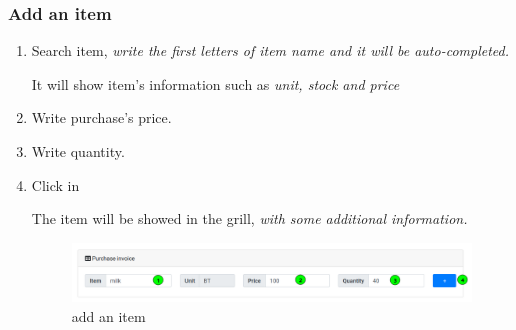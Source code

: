 \documentclass[a4paper,11pt]{refart}
\begin{document}
\subsubsection{Add an item}
\begin{enumerate}
	\item Search item, \emph{write the first letters of item name and it will be auto-completed.}
	
	\medskip
	\begin{leftbar}
		It will show item's information such as \emph{ unit, stock and price}
	\end{leftbar}
	\item Write purchase's price.
	\item Write quantity.
	\item Click in \keys{\texttt{+}}

	\medskip
	\begin{leftbar}
		The item will be showed in the grill,  \emph{with some additional information.}
	\end{leftbar}
	\begin{figure}[H]\centering
		\includegraphics[width=\textwidth]{images/invoice_purchase-item.png}
		\caption{add an item}\label{fig:invoice_purchase-item}
	\end{figure}
\end{enumerate}
\end{document}
